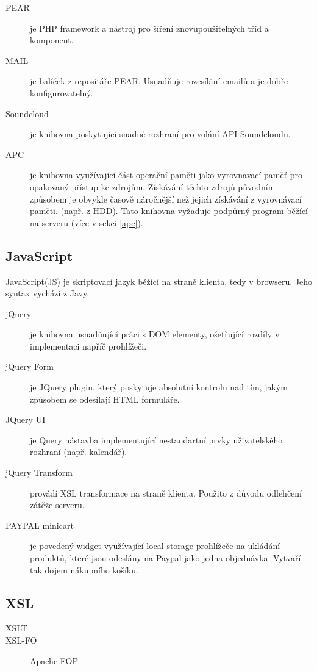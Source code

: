 \documentclass[12pt]{article}
\begin{document}
\begin{description}
\item[PEAR] je PHP framework a nástroj pro šíření znovupoužitelných tříd a komponent.
\item[MAIL] je balíček z repositáře PEAR. Usnadňuje rozesílání emailů a je dobře konfigurovatelný.
\item[Soundcloud] je knihovna poskytující snadné rozhraní pro volání API Soundcloudu.
\item[APC] je knihovna využívající část operační paměti jako vyrovnavací paměť pro opakovaný přístup ke zdrojům. Získávání těchto zdrojů původním způsobem je obvykle časově náročnější než jejich získávání z vyrovnávací paměti. (např. z HDD). Tato knihovna vyžaduje podpůrný program běžící na serveru (více v sekci \ref{apc}).
\end{description}

\subsection{JavaScript}
JavaScript(JS) je skriptovací jazyk běžící na straně klienta, tedy v browseru. Jeho syntax vychází z Javy.

\begin{description}
\item[jQuery] je knihovna usnadňující práci s DOM elementy, ošetřující rozdíly v implementaci napříč prohlížeči.
\item[jQuery Form] je JQuery plugin, který poskytuje absolutní kontrolu nad tím, jakým způsobem se odesílají HTML formuláře.
\item[JQuery UI] je Query nástavba implementující nestandartní prvky uživatelského rozhraní (např. kalendář).
\item[jQuery Transform] provádí XSL transformace na straně klienta. Použito z důvodu odlehčení zátěže serveru.
\item[PAYPAL minicart] je povedený widget využívající local storage prohlížeče na ukládání produktů, které jsou odeslány na Paypal jako jedna objednávka. Vytvaří tak dojem nákupního košíku.
\end{description}

\subsection{XSL}

\begin{description}
\item[XSLT]
\item[XSL-FO] Apache FOP
\end{description}
\end{document}
